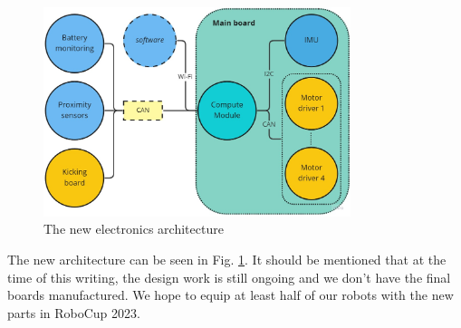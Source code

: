 \documentclass[runningheads]{llncs}
\begin{document}
\begin{figure}
	\centering
	\includegraphics[width=0.8\textwidth]{images/electronics-architecture.jpg}
	\caption{The new electronics architecture}
	\label{fig:electronics-architecture}
\end{figure}

The new architecture can be seen in Fig. \ref{fig:electronics-architecture}. It should be mentioned that at the time of this writing, the design work is still ongoing and we don't have the final boards manufactured. We hope to equip at least half of our robots with the new parts in RoboCup 2023.
\end{document}

